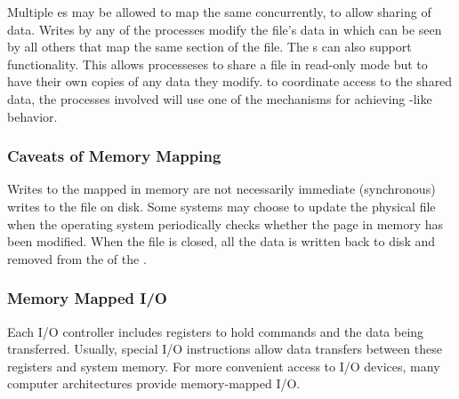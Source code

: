 Multiple es may be allowed to map the same  concurrently, to allow sharing of data.
Writes by any of the processes modify the file's data in  which can be seen by all others that map the same section of the file.
The  s can also support  functionality.
This allows processeses to share a file in read-only mode but to have their own copies of any data they modify.
to coordinate access to the shared data, the processes involved will use one of the mechanisms for achieving -like behavior.

\subsubsection{Caveats of Memory Mapping}\label{subsubsec:Memory_Mapping_Caveats}
Writes to the  mapped in memory are not necessarily immediate (synchronous) writes to the file on disk.
Some systems may choose to update the physical file when the operating system periodically checks whether the page in memory has been modified.
When the file is closed, all the data is written back to disk and removed from the  of the .

\subsubsection{Memory Mapped I/O}\label{subsubsec:Memory_Mapped_IO}
Each I/O controller includes registers to hold commands and the data being transferred.
Usually, special I/O instructions allow data transfers between these registers and system memory.
For more convenient access to I/O devices, many computer architectures provide memory-mapped I/O.


